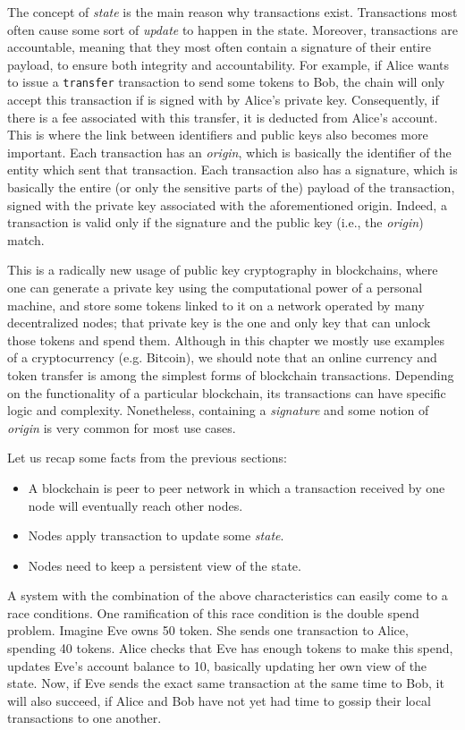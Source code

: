 The concept of \textit{state} is the main reason why transactions exist. Transactions most often
cause some sort of \textit{update} to happen in the state. Moreover, transactions are accountable,
meaning that they most often contain a signature of their entire payload, to ensure both integrity
and accountability. For example, if Alice wants to issue a \texttt{transfer} transaction to send
some tokens to Bob, the chain will only accept this transaction if is signed with by Alice's private
key. Consequently, if there is a fee associated with this transfer, it is deducted from Alice's
account. This is where the link between identifiers and public keys also becomes more important.
Each transaction has an \textit{origin}, which is basically the identifier of the entity which sent
that transaction. Each transaction also has a signature, which is basically the entire (or only the
sensitive parts of the) payload of the transaction, signed with the private key associated with the
aforementioned origin. Indeed, a transaction is valid only if the signature and the public key
(i.e., the \textit{origin}) match.

This is a radically new usage of public key cryptography in blockchains, where one can generate a
private key using the computational power of a personal machine, and store some tokens linked to it
on a network operated by many decentralized nodes; that private key is the one and only key that can
unlock those tokens and spend them. Although in this chapter we mostly use examples of a
cryptocurrency (e.g. Bitcoin), we should note that an online currency and token transfer is among
the simplest forms of blockchain transactions. Depending on the functionality of a particular
blockchain, its transactions can have specific logic and complexity. Nonetheless, containing a
\textit{signature} and some notion of \textit{origin} is very common for most use cases.

Let us recap some facts from the previous sections:

\begin{itemize}
	\item A blockchain is peer to peer network in which a transaction received by one node will
	eventually reach other nodes.
	\item Nodes apply transaction to update some \textit{state}.
	\item Nodes need to keep a persistent view of the state.
\end{itemize}

A system with the combination of the above characteristics can easily come to a race conditions. One
ramification of this race condition is the double spend problem. Imagine Eve owns 50 token. She
sends one transaction to Alice, spending 40 tokens. Alice checks that Eve has enough tokens to make
this spend, updates Eve's account balance to 10, basically updating her own view of the state. Now,
if Eve sends the exact same transaction at the same time to Bob, it will also succeed, if Alice and
Bob have not yet had time to gossip their local transactions to one another.

